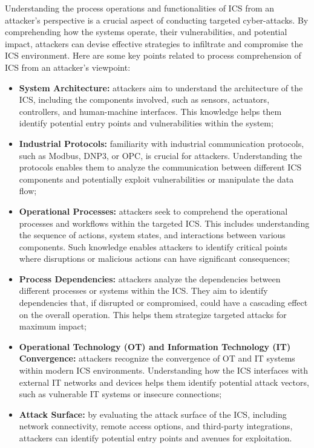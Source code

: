 \bigskip
Understanding the process operations and functionalities of ICS from an attacker's perspective is a crucial aspect of conducting targeted cyber-attacks. By comprehending how the systems operate, their vulnerabilities, and potential impact, attackers can devise effective strategies to infiltrate and compromise the ICS environment. Here are some key points related to process comprehension of ICS from an attacker's viewpoint:

\begin{itemize}
	\item \textbf{System Architecture:} attackers aim to understand the architecture of the ICS, including the components involved, such as sensors, actuators, controllers, and human-machine interfaces. This knowledge helps them identify potential entry points and vulnerabilities within the system;
	
	\item \textbf{Industrial Protocols:} familiarity with industrial communication protocols, such as Modbus, DNP3, or OPC, is crucial for attackers. Understanding the protocols enables them to analyze the communication between different ICS components and potentially exploit vulnerabilities or manipulate the data flow; 
	
	\item \textbf{Operational Processes:} attackers seek to comprehend the operational processes and workflows within the targeted ICS. This includes understanding the sequence of actions, system states, and interactions between various components. Such knowledge enables attackers to identify critical points where disruptions or malicious actions can have significant consequences;
	
	\item \textbf{Process Dependencies:} attackers analyze the dependencies between different processes or systems within the ICS. They aim to identify dependencies that, if disrupted or compromised, could have a cascading effect on the overall operation. This helps them strategize targeted attacks for maximum impact;
	
	\item \textbf{Operational Technology (OT) and Information Technology (IT) Convergence:} attackers recognize the convergence of OT and IT systems within modern ICS environments. Understanding how the ICS interfaces with external IT networks and devices helps them identify potential attack vectors, such as vulnerable IT systems or insecure connections;
	
	\item \textbf{Attack Surface:} by evaluating the attack surface of the ICS, including network connectivity, remote access options, and third-party integrations, attackers can identify potential entry points and avenues for exploitation.
\end{itemize}

